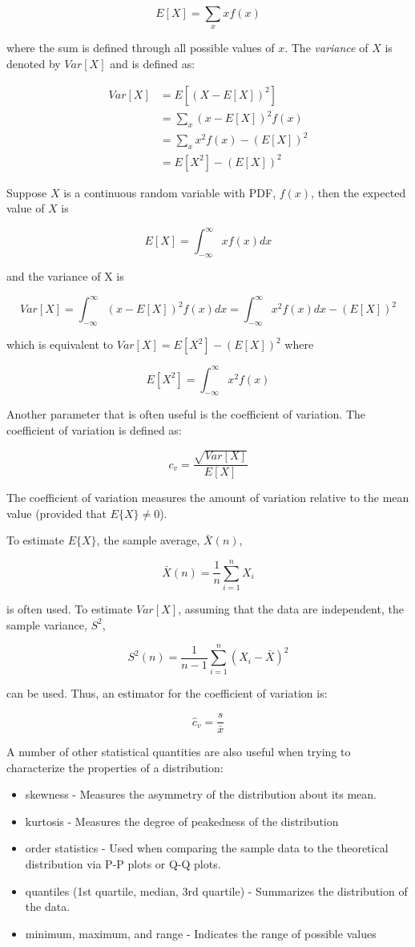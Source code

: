 \documentclass[
]{book}
\theoremstyle{definition}
\theoremstyle{definition}
\theoremstyle{definition}
\theoremstyle{definition}
\theoremstyle{remark}
\begin{document}
\[E[X] = \sum_x xf(x)\]

where the sum is defined through all possible values of \(x\). The
\emph{variance} of \(X\) is denoted by \(Var[X]\) and is defined as:

\[\begin{split}
Var[X] & = E[(X - E[X])^2] \\
      & = \sum_x (x - E[X])^2 f(x) \\
      & = \sum_x x^2 f(x) - (E[X])^2 \\
      & = E[X^2] - (E[X])^2
\end{split}\]

Suppose \(X\) is a continuous random variable with PDF, \(f(x)\), then the
expected value of \(X\) is

\[E[X] = \int_{-\infty}^\infty xf(x) dx\]

and the variance of X is

\[Var[X] = \int_{-\infty}^\infty (x - E[X])^2 f(x)dx = \int_{-\infty}^\infty x^2 f(x)dx -(E[X])^2\]

which is equivalent to \(Var[X] = E[X^2] - (E[X])^2\) where

\[E[X^2] = \int_{-\infty}^\infty x^2 f(x)\]

Another parameter that is often useful is the coefficient of variation.
The coefficient of variation is defined as:

\[c_v = \frac{\sqrt{Var[X]}}{E[X]}\]

The coefficient of variation measures the amount of variation relative
to the mean value (provided that \(E\{X\} \neq 0\)).

To estimate \(E\{X\}\), the sample average, \(\bar{X}(n)\),

\[\bar{X}(n) = \frac{1}{n}\sum_{i=1}^{n}X_i\]

is often used. To estimate \(Var[X]\), assuming that the data are
independent, the sample variance, \(S^{2}\),

\[S^{2}(n) = \frac{1}{n-1}\sum_{i=1}^{n}(X_i - \bar{X})^2\]

can be used. Thus, an estimator for the coefficient of variation is:

\[\hat{c}_v = \frac{s}{\bar{x}}\]

A number of other statistical quantities are also useful when trying to
characterize the properties of a distribution:

\begin{itemize}
\item
  skewness - Measures the asymmetry of the distribution about its
  mean.
\item
  kurtosis - Measures the degree of peakedness of the distribution
\item
  order statistics - Used when comparing the sample data to the
  theoretical distribution via P-P plots or Q-Q plots.
\item
  quantiles (1st quartile, median, 3rd quartile) - Summarizes the
  distribution of the data.
\item
  minimum, maximum, and range - Indicates the range of possible values
\end{itemize}
\end{document}
